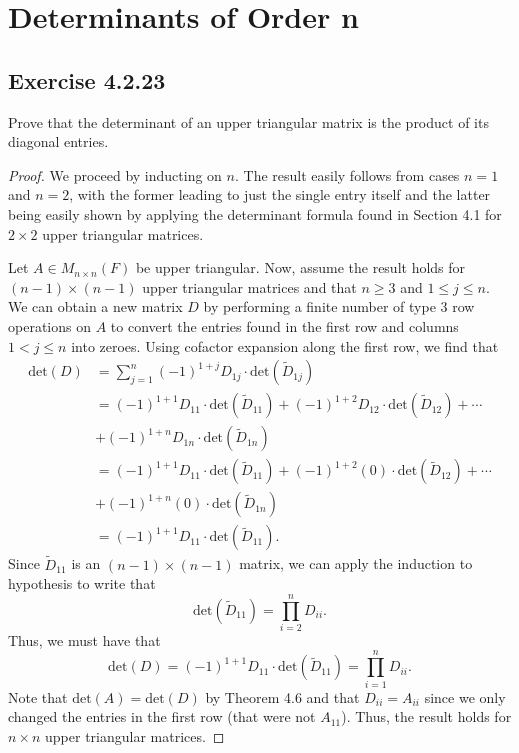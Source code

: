 \section{Determinants of Order n}

\subsection*{Exercise 4.2.23}\label{Exercise 4.2.23} Prove that the determinant of an upper triangular matrix is the product of its diagonal entries.
\begin{proof}
We proceed by inducting on \( n  \). The result easily follows from cases \( n = 1  \) and \( n = 2  \), with the former leading to just the single entry itself and the latter being easily shown by applying the determinant formula found in Section 4.1 for \( 2 \times 2  \) upper triangular matrices.

Let \( A \in {M}_{n \times n}(F) \) be upper triangular. Now, assume the result holds for \( (n-1) \times (n-1)  \) upper triangular matrices and that \( n \geq 3  \) and \(  1 \leq j \leq n  \). We can obtain a new matrix \( D  \) by performing a finite number of type 3 row operations on \( A  \) to convert the entries found in the first row and columns \( 1 < j \leq n    \) into zeroes. Using cofactor expansion along the first row, we find that  
\begin{align*}
    \text{det}(D) &= \sum_{ j=1 }^{ n } (-1)^{1+j} {D}_{1j} \cdot \text{det}({\tilde{D}}_{1j}) \\
                  &=  (-1)^{1+1} {D}_{11} \cdot \text{det}({\tilde{D}}_{11}) + (-1)^{1+2}{D}_{12} \cdot \text{det}({\tilde{D}}_{12}) + \cdots \\ 
                  &+ (-1)^{1+n} {D}_{1n} \cdot \text{det}({\tilde{D}}_{1n}) \\ 
                  &= (-1)^{1+1} {D}_{11} \cdot \text{det}({\tilde{D}}_{11}) + (-1)^{1+2} (0) \cdot \text{det}({\tilde{D}}_{12}) + \cdots \\ 
                  &+ (-1)^{1+n }(0) \cdot \text{det}({\tilde{D}}_{1n}) \\ 
                  &= (-1)^{1+1} {D}_{11} \cdot \text{det}({\tilde{D}}_{11}).
\end{align*}
Since \( {\tilde{D}}_{11} \) is an \( (n-1) \times (n-1) \) matrix, we can apply the induction to hypothesis to write that
\[  \text{det}({\tilde{D}}_{11}) = \prod_{i=2}^{n} {D}_{ii}.  \]
Thus, we must have that
\[  \text{det}(D) = (-1)^{1+1} {D}_{11} \cdot \text{det}({\tilde{D}}_{11}) = \prod_{i=1}^{n} {D}_{ii}.    \]
Note that \( \text{det}(A) = \text{det}(D) \) by Theorem 4.6 and that \( {D}_{ii} = {A}_{ii} \) since we only changed the entries in the first row (that were not \( {A}_{11} \)). Thus, the result holds for \( n \times n  \) upper triangular matrices. 
\end{proof}

